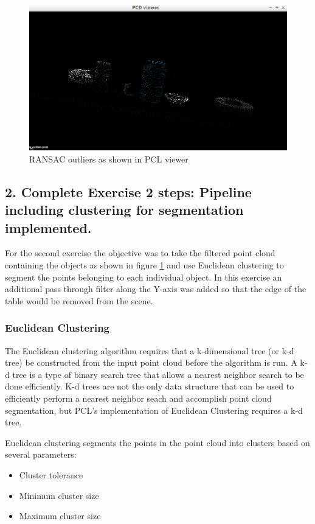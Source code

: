\documentclass{article}
\begin{document}
\begin{figure}[H]
    \includegraphics[width=\linewidth]{ex1extractedoutliers.png}
    \caption{RANSAC outliers as shown in PCL viewer}
    \label{fig:outliers}
\end{figure}

\subsection{2. Complete Exercise 2 steps: Pipeline including clustering for segmentation implemented.}
For the second exercise the objective was to take the filtered point cloud containing the objects as shown in figure \ref{fig:outliers} and use Euclidean clustering to segment the points belonging to each individual object. In this exercise an additional pass through filter along the Y-axis was added so that the edge of the table would be removed from the scene.

\subsubsection{Euclidean Clustering}
The Euclidean clustering algorithm requires that a k-dimensional tree (or k-d tree) be constructed from the input point cloud before the algorithm is run. A k-d tree is a type of binary search tree that allows a nearest neighbor search to be done efficiently. K-d trees are not the only data structure that can be used to efficiently perform a nearest neighbor seach and accomplish point cloud segmentation, but PCL's implementation of Euclidean Clustering requires a k-d tree.

Euclidean clustering segments the points in the point cloud into clusters based on several parameters:
\begin{itemize}
    \item Cluster tolerance
    \item Minimum cluster size
    \item Maximum cluster size
\end{itemize}
\end{document}
